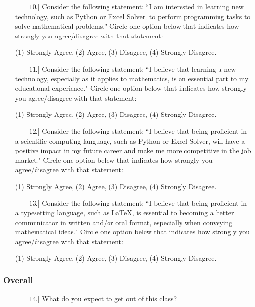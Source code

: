 \documentclass[11pt]{article}
\begin{document}
\begin{enumerate}

\item[{$\qquad 10.]$}] Consider the following statement: ``I am interested in learning new technology, such as Python or Excel Solver, to perform programming tasks to solve mathematical problems."  Circle one option below that indicates how strongly you agree/disagree with that statement:  
\begin{center} 
(1) Strongly Agree, \qquad (2) Agree, \qquad (3) Disagree, \qquad (4) Strongly Disagree. \end{center}

\item[{$\qquad 11.]$}] Consider the following statement: ``I believe that learning a new technology, especially as it applies to mathematics, is an essential part to my educational experience."  Circle one option below that indicates how strongly you agree/disagree with that statement:  
\begin{center} 
(1) Strongly Agree, \qquad (2) Agree, \qquad (3) Disagree, \qquad (4) Strongly Disagree. \end{center}

\item[{$\qquad 12.]$}] Consider the following statement: ``I believe that being proficient in a scientific computing language, such as Python or Excel Solver, will have a positive impact in my future career and make me more competitive in the job market."  Circle one option below that indicates how strongly you agree/disagree with that statement:  
\begin{center} 
(1) Strongly Agree, \qquad (2) Agree, \qquad (3) Disagree, \qquad (4) Strongly Disagree. \end{center}

\item[{$\qquad 13.]$}] Consider the following statement: ``I believe that being proficient in a typesetting language, such as \LaTeX, is essential to becoming a better communicator in written and/or oral format, especially when conveying mathematical ideas."  Circle one option below that indicates how strongly you agree/disagree with that statement:  
\begin{center} 
(1) Strongly Agree, \qquad (2) Agree, \qquad (3) Disagree, \qquad (4) Strongly Disagree. \end{center}

\end{enumerate}


\subsubsection*{Overall}

\begin{enumerate}

\item[{$\qquad 14.]$}] What do you expect to get out of this class? \vfill


\end{enumerate}
\end{document}
